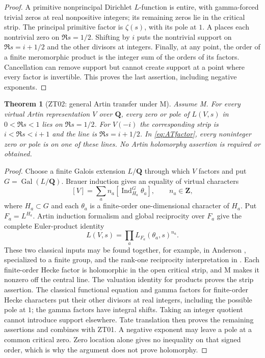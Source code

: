 \documentclass[11pt,a4paper]{article}
\newtheorem{theorem}{Theorem}[section]
\theoremstyle{definition}
\begin{document}
\begin{proof}
A primitive nonprincipal Dirichlet $L$-function is entire, with
gamma-forced trivial zeros at real nonpositive integers; its remaining
zeros lie in the critical strip.  The principal primitive factor is
$\zeta(s)$, with its pole at $1$.  A places each nontrivial zero on
$\Re s=1/2$.  Shifting by $i$ puts the nontrivial support on
$\Re s=i+1/2$ and the other divisors at integers.  Finally, at any point,
the order of a finite meromorphic product is the integer sum of the
orders of its factors.  Cancellation can remove support but cannot
create support at a point where every factor is invertible.  This
proves the last assertion, including negative exponents.
\end{proof}

\begin{theorem}[ZT02: general Artin transfer under M]\label{ZT02}
Assume M.  For every virtual Artin representation $V$ over $\mathbf Q$,
every zero or pole of $L(V,s)$ in $0<\Re s<1$ lies on $\Re s=1/2$.
For $V(-i)$ the corresponding strip is $i<\Re s<i+1$ and the line is
$\Re s=i+1/2$.  In \eqref{eq:ATfactor}, every noninteger zero or pole
is on one of these lines.  No Artin holomorphy assertion is required
or obtained.
\end{theorem}

\begin{proof}
Choose a finite Galois extension $L/\mathbf Q$ through which $V$ factors
and put $G=\operatorname{Gal}(L/\mathbf Q)$.  Brauer induction gives
an equality of virtual characters
\[
 [V]=\sum_a n_a[\operatorname{Ind}_{H_a}^G\theta_a],
 \qquad n_a\in\mathbf Z,
\]
where $H_a\subset G$ and each $\theta_a$ is a finite-order
one-dimensional character of $H_a$.  Put $F_a=L^{H_a}$.
Artin induction formalism and global reciprocity over $F_a$ give the
complete Euler-product identity
\[
 L(V,s)=\prod_a L_{F_a}(\theta_a,s)^{n_a}.
\]
These two classical inputs may be found together, for example, in
Anderson \cite[\S3.8, Proposition 3.8.1; \S5.7, Brauer Induction
Lemma]{Anderson1986}, specialized to a finite group, and the
rank-one reciprocity interpretation in \cite[\S7.2]{FarguesCM}.
Each finite-order Hecke factor is holomorphic in the open critical
strip, and M makes it nonzero off the central line.  The valuation
identity for products proves the strip assertion.  The classical
functional equation and gamma factors for finite-order Hecke
characters put their other divisors at real integers, including the
possible pole at $1$; the gamma factors have integral shifts.
Taking an integer quotient cannot introduce support elsewhere.
Tate translation then proves the remaining assertions and combines
with ZT01.  A negative exponent may leave a pole at a common critical
zero.  Zero location alone gives no inequality on that signed order,
which is why the argument does not prove holomorphy.
\end{proof}
\end{document}
